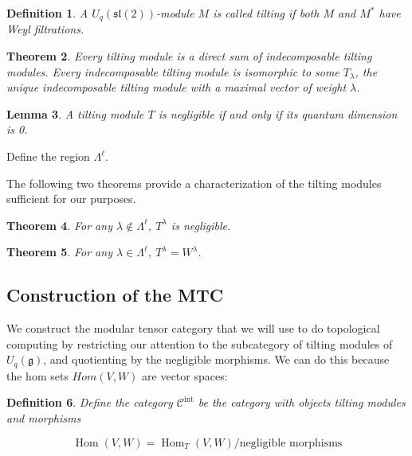 \documentclass[]{article}
\newtheorem{theorem}{Theorem}[subsection]
\newtheorem{defn}[theorem]{Definition}
\newtheorem{lemma}[theorem]{Lemma}
\newcommand{\Hom}{\operatorname{Hom}}
\newcommand{\sll}{\mathfrak{sl}}
\numberwithin{equation}{subsection}
\begin{document}
\begin{defn}
    A $U_q(\sll(2))$-module $M$ is called \emph{tilting} if both $M$ and $M^*$ have Weyl filtrations.
\end{defn}


\begin{theorem}
    Every tilting module is a direct sum of indecomposable tilting modules.
    Every indecomposable tilting module is isomorphic to some $T_\lambda$, the
    unique indecomposable tilting module with a maximal vector of weight
    $\lambda$.
\end{theorem}



\begin{lemma}
    A tilting module $T$ is negligible if and only if its quantum dimension is 0.
\end{lemma}

Define the region $\Lambda^\ell$.

The following two theorems provide a characterization of the tilting modules sufficient for our purposes.

\begin{theorem}
For any $\lambda \notin \Lambda^\ell$, $T^\lambda$ is negligible. 
\end{theorem}

\begin{theorem}
For any $\lambda \in \Lambda^\ell$, $T^\lambda = W^\lambda$.
\end{theorem}



\subsection{Construction of the MTC}

We construct the modular tensor category that we will use to do topological
computing by restricting our attention to the subcategory of tilting modules of
$U_q(\mathfrak{g})$, and quotienting by the negligible morphisms. We can do
this because the hom sets $Hom(V,W)$ are vector spaces:

\begin{defn}
    Define the category $\mathcal{C}^\text{int}$ be the category with objects tilting modules and morphisms 

    \begin{equation*}
        \Hom(V,W) = \Hom_T(V,W) / \text{negligible morphisms}
    \end{equation*}

\end{defn}
\end{document}
